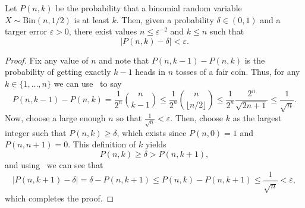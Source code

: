 \begin{lemma}\label{lemma:binomial-approx} 
    Let $P(n, k)$ be the probability that a binomial random variable $X \sim \text{Bin}(n, 1/2)$ is at least $k$. Then, given a probability $\delta \in (0, 1)$ and a targer error $\varepsilon > 0$, there exist values $n \leq \varepsilon^{-2}$ and $k \leq n$ such that 
    \[ 
        |P(n, k) - \delta| < \varepsilon.
    \]
\end{lemma}
\begin{proof}
Fix any value of $n$     and note that $P(n, k-1) - P(n, k)$ is the probability of getting exactly $k-1$ heads in $n$ tosses of a fair coin. Thus, for any $k \in \{1, \ldots, n\}$ we can use~ to say
\begin{equation}\label{eq:prob-diff}
    P(n, k-1) - P(n, k) = \frac{1}{2^{n}} \binom{n}{k-1} \leq \frac{1}{2^{n}} \binom{n}{\lfloor n/2 \rfloor} \leq \frac{1}{2^{n}} \frac{2^n}{\sqrt{2n+1}} \leq \frac{1}{\sqrt{n}}.
\end{equation}
Now, choose a large enough $n$ so that $\frac{1}{\sqrt{n}} < \varepsilon$. Then, choose $k$ as the largest integer such that $P(n, k) \geq \delta$, which exists since $P(n, 0) = 1$ and $P(n, n+1) = 0$. This definition of $k$ yields 
\[ 
    P(n, k) \geq \delta > P(n, k+1),
\]
and using~ we can see that 
\[ 
    |P(n, k+1) - \delta| = \delta - P(n, k+1) \leq P(n, k) - P(n, k+1) \leq \frac{1}{\sqrt{n}} < \varepsilon,
\]
which completes the proof.
\end{proof}

